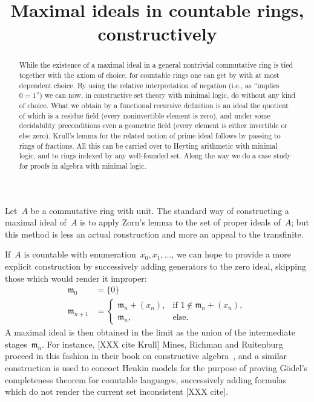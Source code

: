\documentclass[envcountsect,envcountsame,runningheads]{llncs}
\newcommand{\mmm}{\mathfrak{m}}
\renewcommand{\_}{\mathpunct{.}\,}
\begin{document}
\title{Maximal ideals in countable rings, constructively}
\author{}
\email{}

\maketitle

\begin{abstract}
  While the existence of a maximal ideal in a general nontrivial commutative
  ring is tied together with the axiom of choice, for countable rings one can
  get by with at most dependent choice. By using the relative interpretation of
  negation (i.e., as ``implies~$0=1$'') we can now, in constructive set theory with
  minimal logic, do without any kind of choice. What we obtain by a functional
  recursive definition is an ideal the quotient of which is a residue field
  (every noninvertible element is zero), and under some decidability
  preconditions even a geometric field (every element is either invertible or
  else zero). Krull's lemma for the related notion of prime ideal follows by
  passing to rings of fractions. All this can be carried over to Heyting
  arithmetic with minimal logic, and to rings indexed by any well-founded set.
  Along the way we do a case study for proofs in algebra with minimal logic.
\end{abstract}

Let~$A$ be a commutative ring with unit. The standard way of constructing a
maximal ideal of~$A$ is to apply Zorn's lemma to the set of proper ideals
of~$A$; but this method is less an actual construction and more an appeal to
the transfinite.

If~$A$ is countable with enumeration~$x_0,x_1,\ldots$, we can hope to provide a
more explicit construction by successively adding generators to the zero ideal,
skipping those which would render it improper:
\begin{align*}
  \mmm_0 &= \{ 0 \} \\
  \mmm_{n+1} &= \begin{cases}
    \mmm_n + (x_n), & \text{if $1 \not\in \mmm_n + (x_n)$}, \\
    \mmm_n, & \text{else.}
  \end{cases}
\end{align*}
A maximal ideal is then obtained in the limit as the union of the intermediate
stages~$\mmm_n$. For instance, [XXX cite Krull] Mines, Richman and Ruitenburg
proceed in this fashion in their book on constructive
algebra~\cite[Lemma~VI.3.2]{mines-richman-ruitenburg:constructive-algebra}, and a similar
construction is used to concoct Henkin models for the purpose of proving
Gödel's completeness theorem for countable languages, successively adding
formulas which do not render the current set inconsistent [XXX cite].
\end{document}
